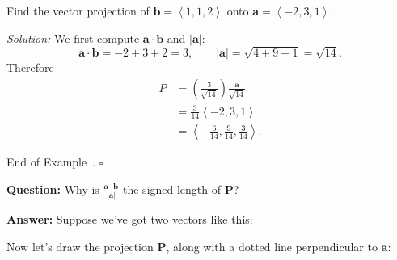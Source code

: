 \documentclass[10pt]{article}
\theoremstyle{definition}
\newtheorem{example}[theorem]{Example}
\renewenvironment{example}
{\begin{oldexample}}
  {\par\smallskip\hfill   End of Example~\theexample. $\square$    \par\end{oldexample}}
\newcommand{\vt}{\vskip 5mm} %
\newcommand{\fl}{\noindent\textbf} %
\newcommand{\Fl}{\vt\noindent\textbf} %
\newcommand{\1}[1]{\textbf{1}_{\left[#1\right]}} %
\begin{document}
\begin{example}
  Find the vector projection of $\mathbf{b}=\left\langle 1,1,2 \right\rangle $ onto
  $\mathbf{a} = \left\langle -2,3,1 \right\rangle$. 

  \noindent\textit{Solution:} We first compute $\mathbf{a}\cdot \mathbf{b}$
  and $|\mathbf{a}|$:
  \begin{equation*}
    \mathbf{a}\cdot \mathbf{b} = -2 + 3 +2 = 3, \qquad |\mathbf{a}| = \sqrt{4+9+1} = \sqrt{14}.
  \end{equation*}
  Therefore
  \begin{align*}
    P
    &= \left( \frac{3}{\sqrt{14}} \right) \frac{\mathbf{a}}{\sqrt{14}}\\
    &= \frac{3}{14} \left\langle -2, 3,1 \right\rangle \\
    &= \left\langle -\frac{6}{14}, \frac{9}{14}, \frac{3}{14} \right\rangle.
  \end{align*}
\end{example}




\Fl{Question:} Why is $\frac{\mathbf{a}\cdot \mathbf{b}}{|\mathbf{a}|}$ the
signed length of $\mathbf{P}$?


\fl{Answer:} Suppose we've got two vectors like this:
\begin{center}
\end{center}


Now let's draw the projection $\mathbf{P}$, along with a dotted line perpendicular to $\mathbf{a}$:
\end{document}
